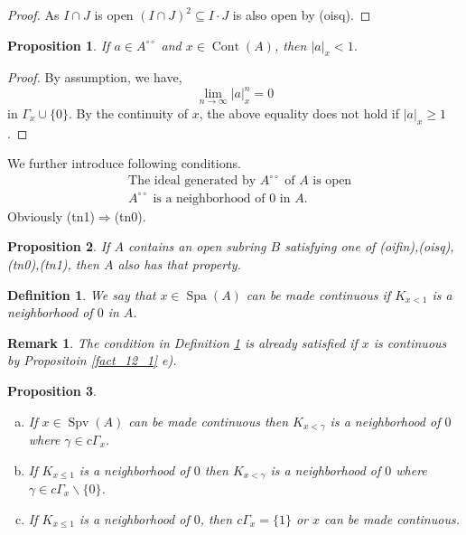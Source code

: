\documentclass[8pt]{article}
\numberwithin{equation}{section}
\newtheorem{proposition}{Proposition}[subsection]
\newtheorem{definition}{Definition}[subsection]
\newtheorem{remark}{Remark}[subsection]
\DeclareMathOperator{\Spa}{Spa}
\DeclareMathOperator{\Spv}{Spv}
\DeclareMathOperator{\Cont}{Cont}
\newcommand{\ab}[1]{\vert #1 \vert}
\newcommand{\cGamma}[0]{c\Gamma}
\newcommand{\dcirc}[0]{{\circ\circ}}
\begin{document}
\begin{proof}
    As $I\cap J$ is open $(I\cap J)^2 \subseteq I\cdot J$ is also open by (oisq).
\end{proof}
\begin{proposition}
    \label{fact_13_6_dash}
    If $a\in A^\dcirc$ and $x\in\Cont(A)$, then $\ab{a}_x<1$.
\end{proposition}
\begin{proof}
    By assumption, we have,
    \begin{equation*}
        \lim_{n\to\infty}\ab{a}_x^n = 0
    \end{equation*}
    in $\Gamma_x\cup\{0\}$. By the continuity of $x$, the above equality does not hold if $\ab{a}_x\geq1$. 
\end{proof}
We further introduce following conditions.
\begin{align*}
    &\text{The ideal generated by $A^{\dcirc}$ of $A$ is open}\tag{tn0}\\
    &\text{$A^{\dcirc}$ is a neighborhood of $0$ in $A$.}\tag{tn1}
\end{align*}
Obviously (tn1)$\Rightarrow$(tn0). %
\begin{proposition}
    \label{fact_13_7}
    If $A$ contains an open subring $B$ satisfying one of (oifin),(oisq), (tn0),(tn1), then $A$ also has that property.
\end{proposition}
\begin{definition}
    \label{definition_13_4}
    We say that $x\in\Spa(A)$ can be made continuous if $K_{x<1}$ is a neighborhood of $0$ in $A$.
\end{definition}
\begin{remark}
    The condition in Definition \ref{definition_13_4} is already satisfied if $x$ is continuous by Propositoin \ref{fact_12_1} e).
\end{remark}
\begin{proposition}$\:$
    \label{fact_13_8}
    \begin{enumerate}[a.]
        \item If $x\in\Spv(A)$ can be made continuous then $K_{x<\gamma}$ is a neighborhood of $0$ where $\gamma\in\cGamma_x$.
        \item If $K_{x\leq 1}$ is a neighborhood of $0$ then $K_{x<\gamma}$ is a neighborhood of $0$ where $\gamma\in\cGamma_x\backslash\{0\}$.
        \item If $K_{x\leq 1}$ is a neighborhood of $0$, then $\cGamma_x=\{1\}$ or $x$ can be made continuous.
    \end{enumerate}
\end{proposition}
\end{document}
